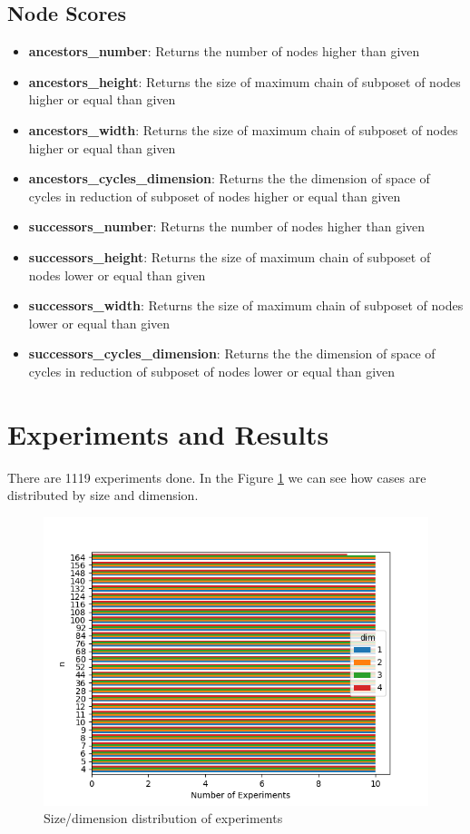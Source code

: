 \documentclass{article}
\begin{document}
\subsection{Node Scores}
\begin{itemize}
\item \textbf{ancestors\_number}: Returns the number of nodes higher than given
\item \textbf{ancestors\_height}: Returns the size of maximum chain of subposet of nodes higher or equal than given
\item \textbf{ancestors\_width}: Returns the size of maximum chain of subposet of nodes higher or equal than given
\item \textbf{ancestors\_cycles\_dimension}: Returns the the dimension of space of cycles in reduction of subposet of nodes higher or equal than given
\item \textbf{successors\_number}: Returns the number of nodes higher than given
\item \textbf{successors\_height}: Returns the size of maximum chain of subposet of nodes lower or equal than given
\item \textbf{successors\_width}: Returns the size of maximum chain of subposet of nodes lower or equal than given
\item \textbf{successors\_cycles\_dimension}: Returns the the dimension of space of cycles in reduction of subposet of nodes lower or equal than given
\end{itemize}

\section{Experiments and Results}
\par There are 1119 experiments done. In the Figure \ref{fig:cases_distribution} we can see how cases are distributed by size and dimension.
\begin{figure}[ht]
  \centering
  \includegraphics[width=\textwidth]{pics/scores - cases.png}
  \caption{Size/dimension distribution of experiments}
  \label{fig:cases_distribution}
\end{figure}
\end{document}
